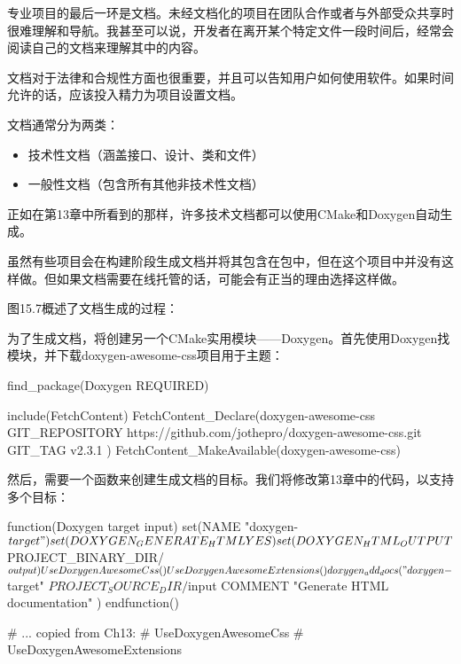 

专业项目的最后一环是文档。未经文档化的项目在团队合作或者与外部受众共享时很难理解和导航。我甚至可以说，开发者在离开某个特定文件一段时间后，经常会阅读自己的文档来理解其中的内容。

文档对于法律和合规性方面也很重要，并且可以告知用户如何使用软件。如果时间允许的话，应该投入精力为项目设置文档。

文档通常分为两类：

\begin{itemize}
\item
技术性文档（涵盖接口、设计、类和文件）

\item
一般性文档（包含所有其他非技术性文档）
\end{itemize}

正如在第13章中所看到的那样，许多技术文档都可以使用CMake和Doxygen自动生成。


虽然有些项目会在构建阶段生成文档并将其包含在包中，但在这个项目中并没有这样做。但如果文档需要在线托管的话，可能会有正当的理由选择这样做。

图15.7概述了文档生成的过程：


为了生成文档，将创建另一个CMake实用模块——Doxygen。首先使用Doxygen找模块，并下载doxygen-awesome-css项目用于主题：


\begin{cmake}
find_package(Doxygen REQUIRED)

include(FetchContent)
FetchContent_Declare(doxygen-awesome-css
    GIT_REPOSITORY
        https://github.com/jothepro/doxygen-awesome-css.git
    GIT_TAG
        v2.3.1
)
FetchContent_MakeAvailable(doxygen-awesome-css)
\end{cmake}

然后，需要一个函数来创建生成文档的目标。我们将修改第13章中的代码，以支持多个目标：


\begin{cmake}
function(Doxygen target input)
    set(NAME "doxygen-${target}")
    set(DOXYGEN_GENERATE_HTML YES)
    set(DOXYGEN_HTML_OUTPUT ${PROJECT_BINARY_DIR}/${output})

    UseDoxygenAwesomeCss()
    UseDoxygenAwesomeExtensions()

    doxygen_add_docs("doxygen-${target}"
        ${PROJECT_SOURCE_DIR}/${input}
        COMMENT "Generate HTML documentation"
    )
endfunction()

# ... copied from Ch13:
# UseDoxygenAwesomeCss
# UseDoxygenAwesomeExtensions
\end{cmake}

